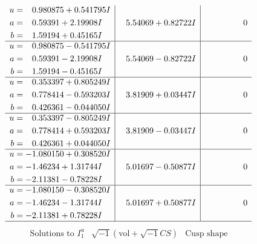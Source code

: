 \documentclass[1p]{elsarticle_modified}
\theoremstyle{definition}
\newcommand{\I}{\sqrt{-1}}
\begin{document}
$$\begin{array}{c|c|c}
\begin{aligned}
u &= \phantom{-}0.980875 + 0.541795 I \\
a &= \phantom{-}0.59391 + 2.19908 I \\
b &= \phantom{-}1.59194 + 0.45165 I\end{aligned}
 & \phantom{-}5.54069 + 0.82722 I & \phantom{-0.000000 } 0 \\ \hline\begin{aligned}
u &= \phantom{-}0.980875 - 0.541795 I \\
a &= \phantom{-}0.59391 - 2.19908 I \\
b &= \phantom{-}1.59194 - 0.45165 I\end{aligned}
 & \phantom{-}5.54069 - 0.82722 I & \phantom{-0.000000 } 0 \\ \hline\begin{aligned}
u &= \phantom{-}0.353397 + 0.805249 I \\
a &= \phantom{-}0.778414 - 0.593203 I \\
b &= \phantom{-}0.426361 - 0.044050 I\end{aligned}
 & \phantom{-}3.81909 + 0.03447 I & \phantom{-0.000000 } 0 \\ \hline\begin{aligned}
u &= \phantom{-}0.353397 - 0.805249 I \\
a &= \phantom{-}0.778414 + 0.593203 I \\
b &= \phantom{-}0.426361 + 0.044050 I\end{aligned}
 & \phantom{-}3.81909 - 0.03447 I & \phantom{-0.000000 } 0 \\ \hline\begin{aligned}
u &= -1.080150 + 0.308520 I \\
a &= -1.46234 + 1.31744 I \\
b &= -2.11381 - 0.78228 I\end{aligned}
 & \phantom{-}5.01697 - 0.50877 I & \phantom{-0.000000 } 0 \\ \hline\begin{aligned}
u &= -1.080150 - 0.308520 I \\
a &= -1.46234 - 1.31744 I \\
b &= -2.11381 + 0.78228 I\end{aligned}
 & \phantom{-}5.01697 + 0.50877 I & \phantom{-0.000000 } 0\\
 \hline 
 \end{array}$$\newpage$$\begin{array}{c|c|c}  
\text{Solutions to }I^u_{1}& \I (\text{vol} + \sqrt{-1}CS) & \text{Cusp shape}\\

\end{array}$$
\end{document}
